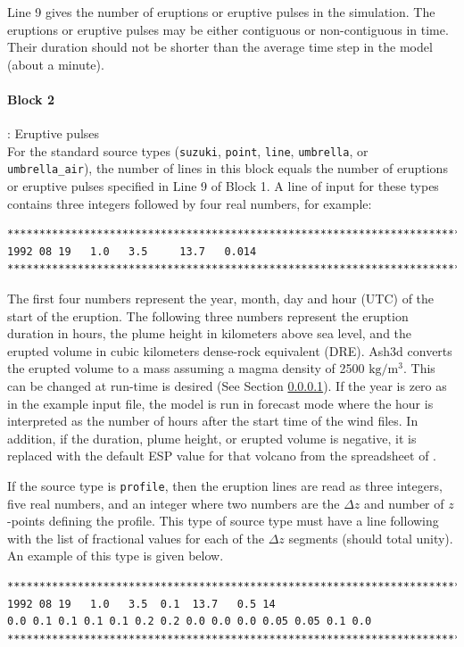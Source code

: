Line 9 gives the number of eruptions or eruptive pulses in the simulation.
The eruptions or eruptive pulses may be either contiguous or non-contiguous
in time. Their duration should not be shorter than the average time step
in the model (about a minute).

\paragraph{Block 2}: Eruptive pulses\\
For the standard source types (\texttt{suzuki}, \texttt{point}, \texttt{line},
\texttt{umbrella}, or \texttt{umbrella\_air}),
the number of lines in this block equals the number of eruptions or eruptive
pulses specified in Line 9 of Block 1.
A line of input for these types contains three integers followed by four
real numbers, for example:
\small
\begin{verbatim}
*******************************************************************************
1992 08 19   1.0   3.5     13.7   0.014
*******************************************************************************
\end{verbatim}
\normalsize

The first four numbers represent the year, month, day and hour (UTC) of the
start of the eruption. The following three numbers represent the eruption
duration in hours, the plume height in kilometers above sea level, and the
erupted volume in cubic kilometers dense-rock equivalent (DRE). Ash3d converts
the erupted volume to a mass assuming a magma density of 2500 $\mathrm{kg/m^3}$.
This can be changed at run-time is desired (See Section \ref{}).
If the year is zero as in the example input file, the model is run in forecast
mode where the hour is interpreted as the number of hours after the start time
of the wind files. In addition, if the duration, plume height, or erupted volume
is negative, it is replaced with the default ESP value for that volcano from the
spreadsheet of \cite{Mastin2009b}.

If the source type is \texttt{profile}, then the eruption lines are read as
three integers, five real numbers, and an integer where
two numbers are the $\Delta z$ and number of $z$-points defining
the profile.  This type of source type must have a line following with the list
of fractional values for each of the $\Delta z$ segments (should total unity).
An example of this type is given below.
\small
\begin{verbatim}
*******************************************************************************
1992 08 19   1.0   3.5  0.1  13.7   0.5 14
0.0 0.1 0.1 0.1 0.1 0.2 0.2 0.0 0.0 0.0 0.05 0.05 0.1 0.0
*******************************************************************************
\end{verbatim}
\normalsize

